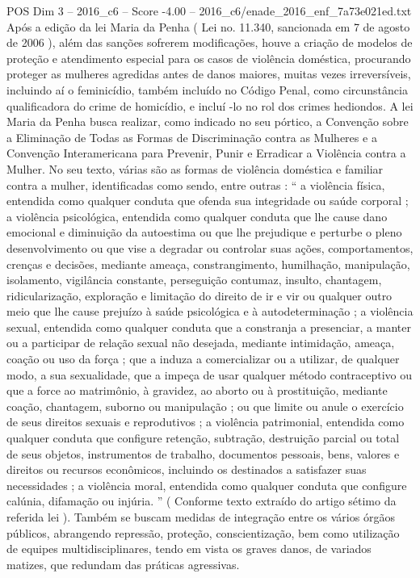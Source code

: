 \begin{textsample}{POS Dim 3 – 2016\_c6 – Score -4.00 – 2016\_c6/enade\_2016\_enf\_7a73e021ed.txt}
Após a edição da lei Maria da Penha ( Lei no. 11.340, sancionada em 7 de agosto de 2006 ), além das sanções sofrerem modificações, houve a criação de modelos de proteção e atendimento especial para os casos de violência doméstica, procurando proteger as mulheres agredidas antes de danos maiores, muitas vezes irreversíveis, incluindo aí o feminicídio, também incluído no Código Penal, como circunstância qualificadora do crime de homicídio, e incluí -lo no rol dos crimes hediondos.
A lei Maria da Penha busca realizar, como indicado no seu pórtico, a Convenção sobre a Eliminação de Todas as Formas de Discriminação contra as Mulheres e a Convenção Interamericana para Prevenir, Punir e Erradicar a Violência contra a Mulher.
No seu texto, várias são as formas de violência doméstica e familiar contra a mulher, identificadas como sendo, entre outras : “ a violência física, entendida como qualquer conduta que ofenda sua integridade ou saúde corporal ; a violência psicológica, entendida como qualquer conduta que lhe cause dano emocional e diminuição da autoestima ou que lhe prejudique e perturbe o pleno desenvolvimento ou que vise a degradar ou controlar suas ações, comportamentos, crenças e decisões, mediante ameaça, constrangimento, humilhação, manipulação, isolamento, vigilância constante, perseguição contumaz, insulto, chantagem, ridicularização, exploração e limitação do direito de ir e vir ou qualquer outro meio que lhe cause prejuízo à saúde psicológica e à autodeterminação ; a violência sexual, entendida como qualquer conduta que a constranja a presenciar, a manter ou a participar de relação sexual não desejada, mediante intimidação, ameaça, coação ou uso da força ; que a induza a comercializar ou a utilizar, de qualquer modo, a sua sexualidade, que a impeça de usar qualquer método contraceptivo ou que a force ao matrimônio, à gravidez, ao aborto ou à prostituição, mediante coação, chantagem, suborno ou manipulação ; ou que limite ou anule o exercício de seus direitos sexuais e reprodutivos ; a violência patrimonial, entendida como qualquer conduta que configure retenção, subtração, destruição parcial ou total de seus objetos, instrumentos de trabalho, documentos pessoais, bens, valores e direitos ou recursos econômicos, incluindo os destinados a satisfazer suas necessidades ; a violência moral, entendida como qualquer conduta que configure calúnia, difamação ou injúria. ” ( Conforme texto extraído do artigo sétimo da referida lei ).
Também se buscam medidas de integração entre os vários órgãos públicos, abrangendo repressão, proteção, conscientização, bem como utilização de equipes multidisciplinares, tendo em vista os graves danos, de variados matizes, que redundam das práticas agressivas.

\end{textsample}
